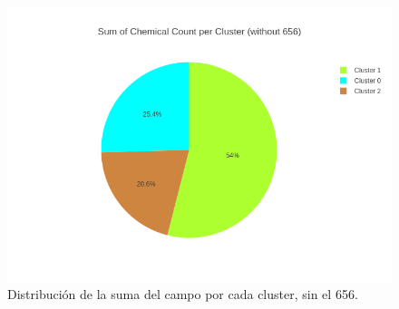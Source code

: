 \begin{figure}[!th]
\includegraphics[scale=0.46]{figures/pie-sum-chemicalcount-without656}
\centering
\caption{Distribución de la suma del campo  por cada cluster, sin el  656.}
\label{fig:pie-sum-chemicalcount-without656}
\end{figure}

















\newpage










